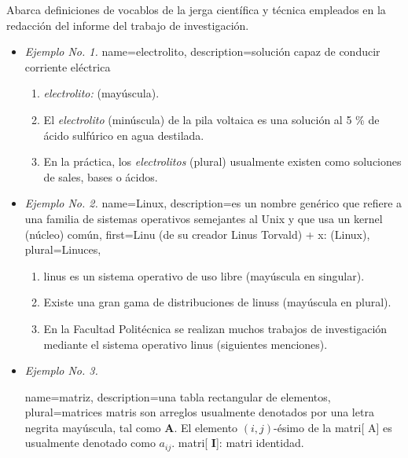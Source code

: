 Abarca definiciones de vocablos de la jerga científica y técnica empleados en la redacción del informe del trabajo de investigación.
\begin{itemize}

\item \textit{Ejemplo No. 1.}
{
name=electrolito,
description={solución capaz de conducir corriente eléctrica}
}
\begin{enumerate}
\item \textit{\Gls{electrolito}:} (mayúscula).
\item El \textit{\gls{electrolito}} (minúscula) de la pila voltaica es una solución  al 5 \% de ácido sulfúrico en agua destilada.
\item En la práctica, los \textit{\glspl{electrolito}} (plural) usualmente existen como soluciones de sales, bases o ácidos.
\end{enumerate}

\item \textit{Ejemplo No. 2.}
{
  name=Linux,
  description={es un nombre genérico  que refiere a una familia de sistemas operativos
  			  semejantes al Unix y que usa un kernel (núcleo) común},
  first={Linu (de su creador Linus Torvald) + x:  (Linux)},
  plural={Linuces},
}

\begin{enumerate}
\item \Gls{linus} es un sistema operativo de uso libre (mayúscula en singular).
\item Existe una gran gama de distribuciones de  \Glspl{linus} (mayúscula en plural).
\item En la Facultad Politécnica se realizan muchos trabajos de investigación mediante el sistema operativo \gls{linus} (siguientes menciones).
\end{enumerate}

\item \textit{Ejemplo No. 3.}

{
name={matriz},%
description={una tabla rectangular de elementos},%
plural={matrices}%
}
\Glspl{matri} son arreglos usualmente denotados por una letra negrita mayúscula, tal como $\mathbf{A}$. El elemento $(i,j)$-ésimo de la \gls{matri}[ A]  es usualmente denotado como $a_{ij}$. \Gls{matri}[ $\mathbf{I}$]: \gls{matri} identidad.

\end{itemize}

